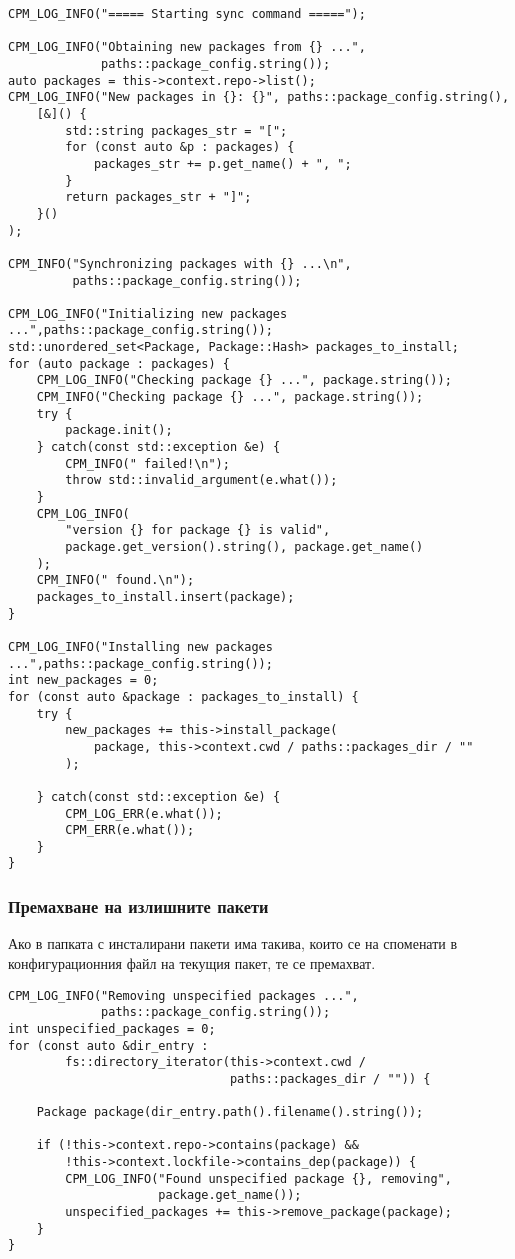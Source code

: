 \begin{lstlisting}[style=cpp,
				   caption=Инсталиране на липсващите пакети,
				   label={lst:sync-install}]
CPM_LOG_INFO("===== Starting sync command =====");

CPM_LOG_INFO("Obtaining new packages from {} ...",
			 paths::package_config.string());
auto packages = this->context.repo->list();
CPM_LOG_INFO("New packages in {}: {}", paths::package_config.string(),
	[&]() {
		std::string packages_str = "[";
		for (const auto &p : packages) {
			packages_str += p.get_name() + ", ";
		}
		return packages_str + "]";
	}()
);

CPM_INFO("Synchronizing packages with {} ...\n",
		 paths::package_config.string());

CPM_LOG_INFO("Initializing new packages ...",paths::package_config.string());
std::unordered_set<Package, Package::Hash> packages_to_install;
for (auto package : packages) {
	CPM_LOG_INFO("Checking package {} ...", package.string());
	CPM_INFO("Checking package {} ...", package.string());
	try {
		package.init();
	} catch(const std::exception &e) {
		CPM_INFO(" failed!\n");
		throw std::invalid_argument(e.what());
	}
	CPM_LOG_INFO(
		"version {} for package {} is valid",
		package.get_version().string(), package.get_name()
	);
	CPM_INFO(" found.\n");
	packages_to_install.insert(package);
}

CPM_LOG_INFO("Installing new packages ...",paths::package_config.string());
int new_packages = 0;
for (const auto &package : packages_to_install) {
	try {
		new_packages += this->install_package(
			package, this->context.cwd / paths::packages_dir / ""
		);
	
	} catch(const std::exception &e) {
		CPM_LOG_ERR(e.what());
		CPM_ERR(e.what());
	}
}
\end{lstlisting}


\subsubsection{Премахване на излишните пакети}

Ако в папката с инсталирани пакети има такива, които се на споменати в
конфигурационния файл на текущия пакет, те се премахват.

\begin{lstlisting}[style=cpp,
				   caption=Премахване на излишните пакети,
				   label={sync-remove}]
CPM_LOG_INFO("Removing unspecified packages ...",
			 paths::package_config.string());
int unspecified_packages = 0;
for (const auto &dir_entry :
		fs::directory_iterator(this->context.cwd /
							   paths::packages_dir / "")) {

	Package package(dir_entry.path().filename().string());

	if (!this->context.repo->contains(package) &&
		!this->context.lockfile->contains_dep(package)) {
		CPM_LOG_INFO("Found unspecified package {}, removing",
					 package.get_name());
		unspecified_packages += this->remove_package(package);
	}
}
\end{lstlisting}


